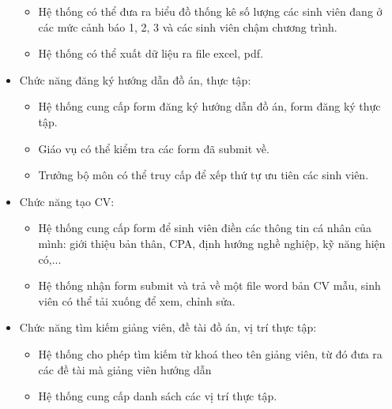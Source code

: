 \begin{itemize}
	      \begin{itemize}
		      \item Hệ thống có thể đưa ra biểu đồ thống kê số lượng các sinh viên đang ở các mức cảnh báo 1, 2, 3 và các sinh viên chậm chương trình.
		      \item Hệ thống có thể xuất dữ liệu ra file excel, pdf.
	      \end{itemize}
	\item Chức năng đăng ký hướng dẫn đồ án, thực tập:
	      \begin{itemize}
		      \item Hệ thống cung cấp form đăng ký hướng dẫn đồ án, form đăng ký thực tập.
		      \item Giáo vụ có thể kiểm tra các form đã submit về.
		      \item Trưởng bộ môn có thể truy cấp để xếp thứ tự ưu tiên các sinh viên.
	      \end{itemize}
	\item Chức năng tạo CV:
	      \begin{itemize}
		      \item Hệ thống cung cấp form để sinh viên điền các thông tin cá nhân của mình: giới thiệu bản thân, CPA, định hướng nghề nghiệp, kỹ năng hiện có,...
		      \item Hệ thống nhận form submit và trả về một file word bản CV mẫu, sinh viên có thể tải xuống để xem, chỉnh sửa.
	      \end{itemize}
	\item Chức năng tìm kiếm giảng viên, đề tài đồ án, vị trí thực tập:
	      \begin{itemize}
		      \item Hệ thống cho phép tìm kiếm từ khoá theo tên giảng viên, từ đó đưa ra các đề tài mà giảng viên hướng dẫn
		      \item Hệ thống cung cấp danh sách các vị trí thực tập.
	      \end{itemize}
\end{itemize}

